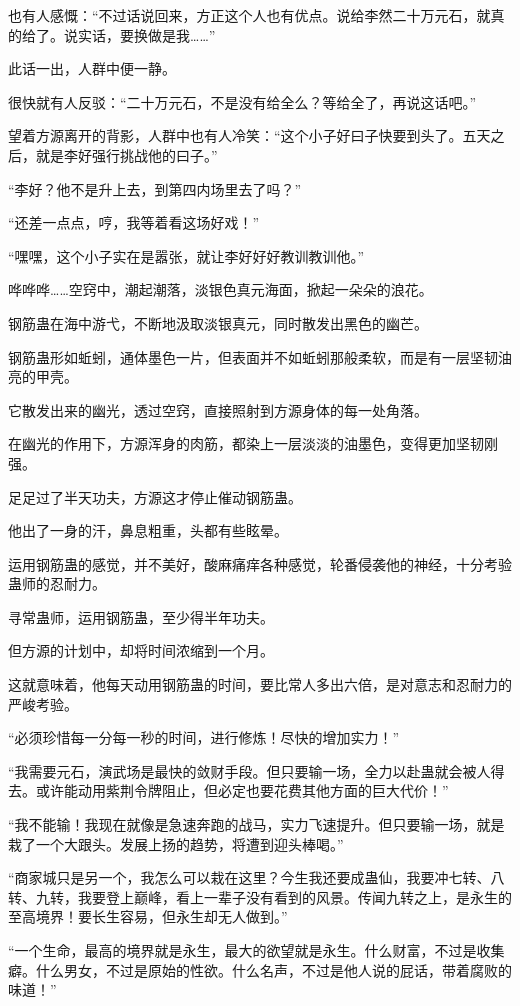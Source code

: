 \begin{this_body}
也有人感慨：“不过话说回来，方正这个人也有优点。说给李然二十万元石，就真的给了。说实话，要换做是我……”

此话一出，人群中便一静。

很快就有人反驳：“二十万元石，不是没有给全么？等给全了，再说这话吧。”

望着方源离开的背影，人群中也有人冷笑：“这个小子好曰子快要到头了。五天之后，就是李好强行挑战他的曰子。”

“李好？他不是升上去，到第四内场里去了吗？”

“还差一点点，哼，我等着看这场好戏！”

“嘿嘿，这个小子实在是嚣张，就让李好好好教训教训他。”

哗哗哗……空窍中，潮起潮落，淡银色真元海面，掀起一朵朵的浪花。

钢筋蛊在海中游弋，不断地汲取淡银真元，同时散发出黑色的幽芒。

钢筋蛊形如蚯蚓，通体墨色一片，但表面并不如蚯蚓那般柔软，而是有一层坚韧油亮的甲壳。

它散发出来的幽光，透过空窍，直接照射到方源身体的每一处角落。

在幽光的作用下，方源浑身的肉筋，都染上一层淡淡的油墨色，变得更加坚韧刚强。

足足过了半天功夫，方源这才停止催动钢筋蛊。

他出了一身的汗，鼻息粗重，头都有些眩晕。

运用钢筋蛊的感觉，并不美好，酸麻痛痒各种感觉，轮番侵袭他的神经，十分考验蛊师的忍耐力。

寻常蛊师，运用钢筋蛊，至少得半年功夫。

但方源的计划中，却将时间浓缩到一个月。

这就意味着，他每天动用钢筋蛊的时间，要比常人多出六倍，是对意志和忍耐力的严峻考验。

“必须珍惜每一分每一秒的时间，进行修炼！尽快的增加实力！”

“我需要元石，演武场是最快的敛财手段。但只要输一场，全力以赴蛊就会被人得去。或许能动用紫荆令牌阻止，但必定也要花费其他方面的巨大代价！”

“我不能输！我现在就像是急速奔跑的战马，实力飞速提升。但只要输一场，就是栽了一个大跟头。发展上扬的趋势，将遭到迎头棒喝。”

“商家城只是另一个，我怎么可以栽在这里？今生我还要成蛊仙，我要冲七转、八转、九转，我要登上巅峰，看上一辈子没有看到的风景。传闻九转之上，是永生的至高境界！要长生容易，但永生却无人做到。”

“一个生命，最高的境界就是永生，最大的欲望就是永生。什么财富，不过是收集癖。什么男女，不过是原始的性欲。什么名声，不过是他人说的屁话，带着腐败的味道！”


\end{this_body}
